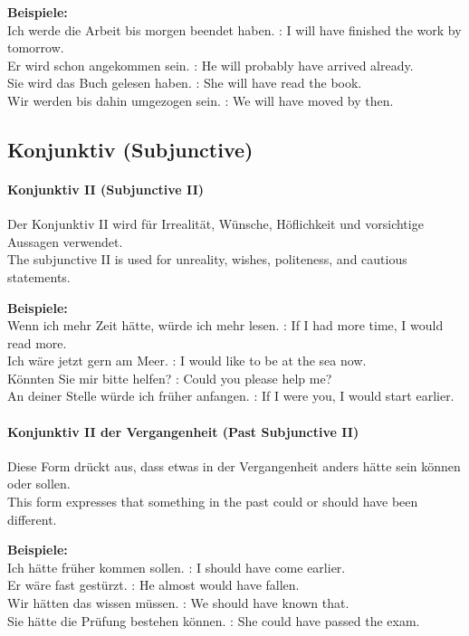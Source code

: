 \documentclass[a4paper]{article}
\begin{document}
            \textbf{Beispiele:}\\
            Ich werde die Arbeit bis morgen beendet haben. : I will have finished the work by tomorrow.\\
            Er wird schon angekommen sein. : He will probably have arrived already.\\
            Sie wird das Buch gelesen haben. : She will have read the book.\\
            Wir werden bis dahin umgezogen sein. : We will have moved by then.
    
    \subsection{Konjunktiv {\small (Subjunctive)}}
    
    \paragraph{Konjunktiv II {\small (Subjunctive II)}}
        Der Konjunktiv II wird für Irrealität, Wünsche, Höflichkeit und vorsichtige Aussagen verwendet.\\
        The subjunctive II is used for unreality, wishes, politeness, and cautious statements.
        
        \textbf{Beispiele:}\\
        Wenn ich mehr Zeit hätte, würde ich mehr lesen. : If I had more time, I would read more.\\
        Ich wäre jetzt gern am Meer. : I would like to be at the sea now.\\
        Könnten Sie mir bitte helfen? : Could you please help me?\\
        An deiner Stelle würde ich früher anfangen. : If I were you, I would start earlier.
    
    \paragraph{Konjunktiv II der Vergangenheit {\small (Past Subjunctive II)}}
        Diese Form drückt aus, dass etwas in der Vergangenheit anders hätte sein können oder sollen.\\
        This form expresses that something in the past could or should have been different.
        
        \textbf{Beispiele:}\\
        Ich hätte früher kommen sollen. : I should have come earlier.\\
        Er wäre fast gestürzt. : He almost would have fallen.\\
        Wir hätten das wissen müssen. : We should have known that.\\
        Sie hätte die Prüfung bestehen können. : She could have passed the exam.
    
\end{document}
